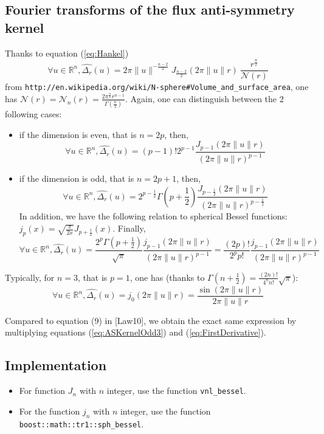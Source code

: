 \documentclass[11pt]{amsart}
\begin{document}
\subsection{Fourier transforms of the flux anti-symmetry kernel}
Thanks to equation (\ref{eq:Hankel})
\begin{equation}\label{eq:ASKernel0}
\forall u\in\mathbb{R}^n,  \widehat{\Delta_r} (u) =  2\pi \|u\|^{-\frac{n-2}{2}} J_{\frac{n-2}{2}}(2\pi \|u\| r) ~\frac{r^{\frac{n}{2}}  }{\mathcal{N}(r)}
\end{equation}
from \texttt{http://en.wikipedia.org/wiki/N-sphere\#Volume\_and\_surface\_area}, one has $\mathcal{N}(r) = \mathcal{N}_n(r) = \frac{2 \pi^\frac{n}{2} r^{n-1}}{\Gamma(\frac{n}{2})}$. Again, one can distinguish between the 2 following cases:
\begin{itemize}
\item if the dimension is even, that is $n = 2p$, then,
\begin{equation}\label{eq:ASKernelEven}
\forall u\in\mathbb{R}^n,  \widehat{\Delta_r} (u) =  (p-1)! 2^{p-1} \frac{J_{p-1}(2\pi \|u\| r)}{(2\pi \|u\| r)^{p-1}}
\end{equation}
\item if the dimension is odd, that is $n = 2p+1$, then,
\begin{equation}\label{eq:ASKernelOdd1}
\forall u\in\mathbb{R}^n,  \widehat{\Delta_r} (u) =  2^{p-\frac{1}{2}}\Gamma\left(p + \frac{1}{2}\right) \frac{J_{p-\frac{1}{2}}(2\pi \|u\| r)}{(2\pi \|u\| r)^{p-\frac{1}{2}}}
\end{equation}
In addition, we have the following relation to spherical Bessel functions: $j_p(x) = \sqrt{\frac{\pi}{2 x}}J_{p+\frac{1}{2}}(x)$. Finally, 
\begin{equation}\label{eq:ASKernelOdd2}
\forall u\in\mathbb{R}^n,  \widehat{\Delta_r} (u) = \frac{2^{p}\Gamma\left(p + \frac{1}{2}\right)}{\sqrt{\pi}} \frac{j_{p-1}(2\pi \|u\| r)}{(2\pi \|u\| r)^{p-1} } = \frac{(2p)!}{2^p p!} \frac{j_{p-1}(2\pi \|u\| r)}{(2\pi \|u\| r)^{p-1} }
\end{equation}
\end{itemize}
Typically, for $n=3$, that is $p=1$, one has (thanks to $\Gamma(n+\frac{1}{2}) = \frac{(2n)!}{4^n n!}\sqrt{\pi}$):
\begin{equation}\label{eq:ASKernelOdd3}
\forall u\in\mathbb{R}^n,  \widehat{\Delta_r} (u) =  j_{0}(2\pi \|u\| r) =  \frac{\sin(2\pi \|u\| r)}{2\pi \|u\| r}
\end{equation}

Compared to equation (9) in [Law10], we obtain the exact same expression by multiplying equations (\ref{eq:ASKernelOdd3}) and (\ref{eq:FirstDerivative}).

\subsection{Implementation}
\begin{itemize}
\item For function $J_n$ with $n$ integer, use the function \texttt{vnl\_bessel}.
\item For the function $j_n$ with $n$ integer, use the function \texttt{boost::math::tr1::sph\_bessel}.
\end{itemize}
\end{document}
